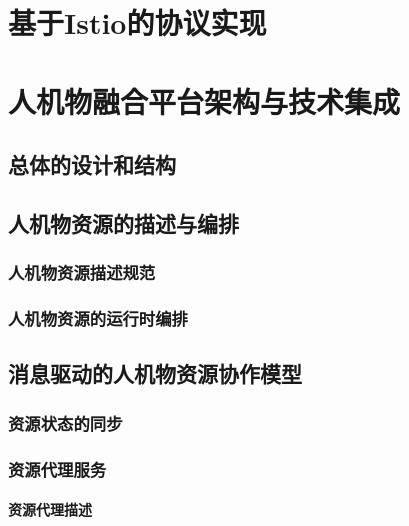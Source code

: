 \documentclass[12pt,a4paper]{article}
\begin{document}





\section{基于Istio的协议实现}\label{baseistio}

\newpage
\section{人机物融合平台架构与技术集成} 

\subsection{总体的设计和结构}

\subsection{人机物资源的描述与编排}
\subsubsection{人机物资源描述规范}
\subsubsection{人机物资源的运行时编排}
\subsection{消息驱动的人机物资源协作模型}
\subsubsection{资源状态的同步}
\subsubsection{资源代理服务}
\paragraph{资源代理描述}
\end{document}
